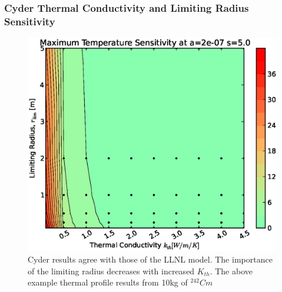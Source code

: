 \begin{frame}[ctb!]
\frametitle{Cyder Thermal Conductivity and Limiting Radius Sensitivity}

\begin{figure}[htbp!]
\begin{center}
\includegraphics[height=0.7\textheight]{./thermal_demonstration/conductivity/kr.eps}
\end{center}
\caption[$K_{th}$ vs. $r_{lim}$ Sensitivity in Cyder]
{Cyder results agree with 
those of the LLNL model. The importance of the limiting radius decreases with 
increased $K_{th}$. The above example thermal profile results from 10kg of 
$^{242}Cm$}
\label{fig:kr}
\end{figure}
\end{frame}

